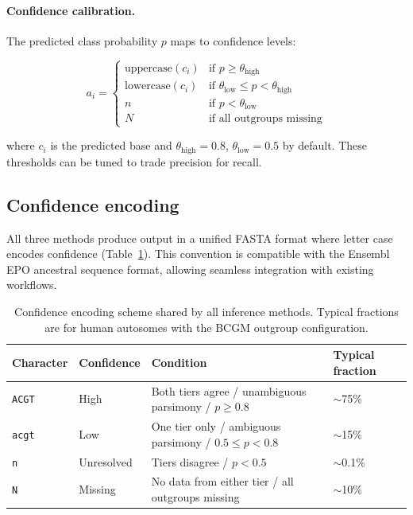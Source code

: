 \documentclass[11pt,a4paper]{article}
\begin{document}
\paragraph{Confidence calibration.}
The predicted class probability $p$ maps to confidence levels:

\begin{equation}
\label{eq:ml_conf}
a_i = \begin{cases}
    \text{uppercase}(c_i) & \text{if } p \ge \theta_\text{high} \\
    \text{lowercase}(c_i) & \text{if } \theta_\text{low} \le p < \theta_\text{high} \\
    n & \text{if } p < \theta_\text{low} \\
    N & \text{if all outgroups missing}
\end{cases}
\end{equation}

\noindent where $c_i$ is the predicted base and $\theta_\text{high} = 0.8$,
$\theta_\text{low} = 0.5$ by default. These thresholds can be tuned to trade
precision for recall.

\subsection{Confidence encoding}
\label{sec:confidence}

All three methods produce output in a unified FASTA format where letter case
encodes confidence (Table~\ref{tab:confidence}). This convention is compatible
with the Ensembl EPO ancestral sequence format, allowing seamless integration
with existing workflows.

\begin{table}[t]
\centering
\caption{Confidence encoding scheme shared by all inference methods.
Typical fractions are for human autosomes with the BCGM outgroup
configuration.}
\label{tab:confidence}
\begin{tabular}{@{}llll@{}}
\toprule
Character & Confidence & Condition & Typical fraction \\
\midrule
\texttt{ACGT} & High & Both tiers agree / unambiguous parsimony / $p \ge 0.8$ & $\sim$75\% \\
\texttt{acgt} & Low & One tier only / ambiguous parsimony / $0.5 \le p < 0.8$ & $\sim$15\% \\
\texttt{n} & Unresolved & Tiers disagree / $p < 0.5$ & $\sim$0.1\% \\
\texttt{N} & Missing & No data from either tier / all outgroups missing & $\sim$10\% \\
\bottomrule
\end{tabular}
\end{table}
\end{document}
